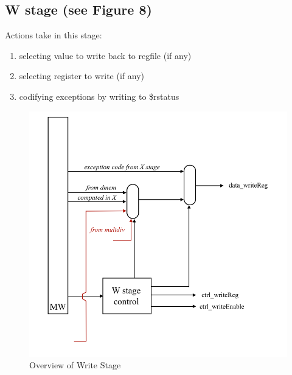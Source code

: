 \documentclass[letterpaper]{article}
\begin{document}
\subsection{W stage (see Figure 8)}
Actions take in this stage:
\begin{enumerate}
    \item selecting value to write back to regfile (if any)
    \item selecting register to write (if any)
    \item codifying exceptions by writing to \$rstatus
\end{enumerate}
\begin{figure}[h]
    \centering
    \includegraphics[width=\textwidth]{Write.png}
    \caption{Overview of Write Stage}
    \label{fig:my_label}
\end{figure}
\clearpage
\end{document}
